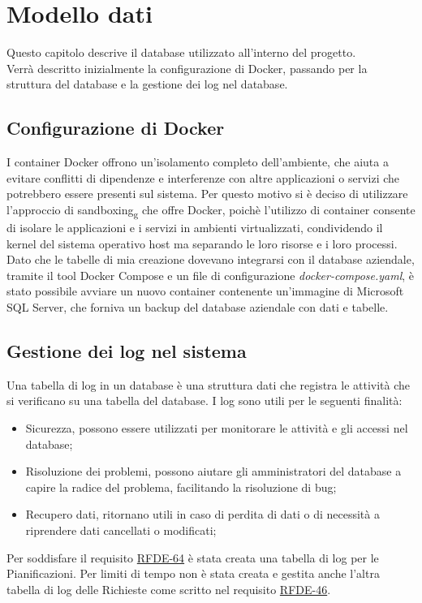 \chapter{Modello dati}
\label{cap:database}
Questo capitolo descrive il database utilizzato all'interno del progetto.\\
Verrà descritto inizialmente la configurazione di Docker, passando per la struttura del database e la gestione dei log nel database.\\

\section{Configurazione di Docker}
I container Docker offrono un'isolamento completo dell'ambiente, che aiuta a evitare conflitti di dipendenze e interferenze con altre applicazioni o servizi che potrebbero essere presenti sul sistema. Per questo motivo si è deciso di utilizzare l'approccio di sandboxing\textsubscript{g} che offre Docker, poichè l'utilizzo di container consente di isolare le applicazioni e i servizi in ambienti virtualizzati, condividendo il kernel del sistema operativo host ma separando le loro risorse e i loro processi.\\
Dato che le tabelle di mia creazione dovevano integrarsi con il database aziendale, tramite il tool Docker Compose e un file di configurazione \textit{docker-compose.yaml}, è stato possibile avviare un nuovo container contenente un'immagine di Microsoft SQL Server, che forniva un backup del database aziendale con dati e tabelle.\\



\section{Gestione dei log nel sistema}
Una tabella di log in un database è una struttura dati che registra le attività che si verificano su una tabella del database. I log sono utili per le seguenti finalità:
\begin{itemize}
\item Sicurezza, possono essere utilizzati per monitorare le attività e gli accessi nel database;
\item Risoluzione dei problemi, possono aiutare gli amministratori del database a capire la radice del problema, facilitando la risoluzione di bug;
\item Recupero dati, ritornano utili in caso di perdita di dati o di necessità a riprendere dati cancellati o modificati;
\end{itemize} 
Per soddisfare il requisito \hyperlink{rf64}{RFDE-64} è stata creata una tabella di log per le Pianificazioni.
Per limiti di tempo non è stata creata e gestita anche l'altra tabella di log delle Richieste come scritto nel requisito \hyperlink{rf46}{RFDE-46}.\\
